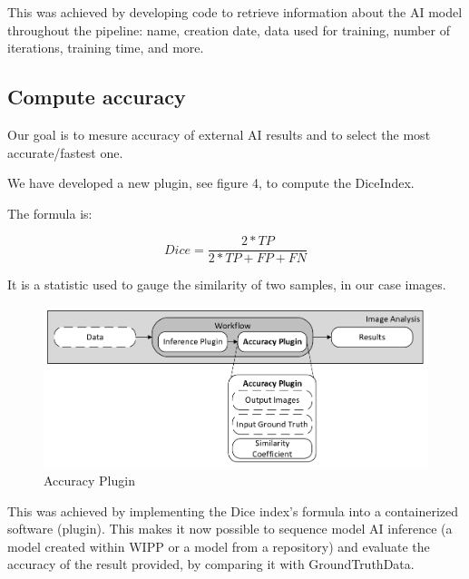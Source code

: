 This was achieved by developing code to retrieve information about the AI model
throughout the pipeline: name, creation date, data used for training, number of
iterations, training time, and more.

\subsection{Compute accuracy}

Our goal is to mesure accuracy of external AI results and to select the most
accurate/fastest one.

We have developed a new plugin, see figure 4, to compute the \Gls{DiceIndex}.

The formula is:

\[ Dice = \frac{2*TP}{2*TP + FP + FN} \]

It is a statistic used to gauge the similarity of two samples, in
our case images.

\begin{figure}[H]
  \centering
  \includegraphics[width=1.0\linewidth]{png/methods/accuracy.png}
  \caption{Accuracy Plugin}
  \label{fig:4accuracy}
\end{figure}

This was achieved by implementing the Dice index's formula into a containerized
software (plugin). This makes it now possible to sequence model AI inference (a
model created within WIPP or a model from a repository) and evaluate the
accuracy of the result provided, by comparing it with
\Gls{GroundTruthData}.
